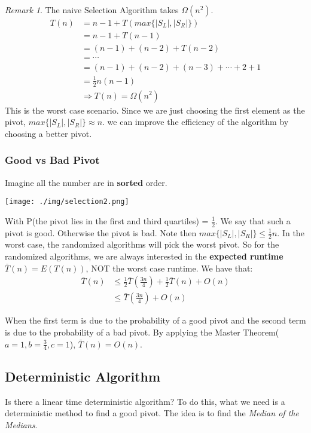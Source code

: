 \documentclass[11pt, a4paper, oneside]{book}
\theoremstyle{theoremdd}
\theoremstyle{remark}
\newtheorem*{remark}{Remark}
\begin{document}
\begin{remark}
The naive Selection Algorithm takes $\Omega(n^2)$. 
\begin{align*}
T(n) & = n-1 + T(max\{|S_{L}|,|S_{R}|\}) \\&
	   = n-1 + T(n-1)\\&
	   = (n-1) + (n-2) + T(n-2)\\&
	   = \cdots \\&
	   = (n-1) + (n-2) + (n-3) + \cdots + 2 + 1\\&
	   = \frac{1}{2}n(n-1) \\&
	   \Rightarrow T(n) = \Omega (n^2)
\end{align*}
This is the worst case scenario. Since we are just choosing the first element as the pivot, $max\{|S_{L}|,|S_{R}|\} \approx n$. we can improve the efficiency of the algorithm by choosing a better pivot. 
\end{remark}

\subsubsection*{Good vs Bad Pivot}
Imagine all the number are in \textbf{sorted} order. 
\begin{center}
\texttt{[image: ./img/selection2.png]}
\end{center}
With P(the pivot lies in the first and third quartiles) = $\frac{1}{2}$. We say that such a pivot is good. Otherwise the pivot is bad. Note then $max\{|S_{L}|,|S_{R}|\} \leq \frac{1}{2}n$. In the worst case, the randomized algorithms will pick the worst pivot. So for the randomized algorithms, we are always interested in the \textbf{expected runtime} $\bar{T}(n)=E(T(n))$, NOT the worst case runtime. We have that: 
\begin{align*}
\bar{T}(n) & \leq \frac{1}{2}\bar{T}(\frac{3n}{4})+\frac{1}{2}\bar{T}(n)+O(n) \\&
		     \leq \bar{T}(\frac{3n}{4}) + O(n)
\end{align*}

When the first term is due to the probability of a good pivot and the second term is due to the probability of a bad pivot. By applying the Master Theorem($a=1,b=\frac{3}{4},c=1$), $\bar{T}(n)=O(n)$.

\subsection{Deterministic Algorithm}
Is there a linear time deterministic algorithm? To do this, what we need is a deterministic method to find a good pivot. The idea is to find the \textit{Median of the Medians}.
\end{document}
